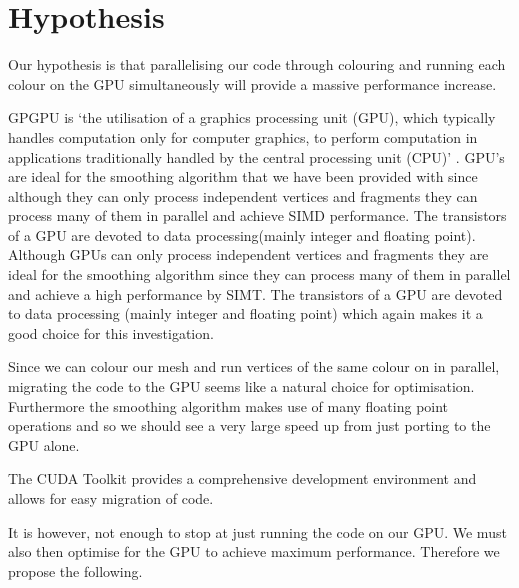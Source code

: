 \section{Hypothesis}
Our hypothesis is that parallelising our code through colouring and running each colour on the GPU simultaneously will provide a massive performance increase.


GPGPU is `the utilisation of a graphics processing unit (GPU), which typically handles computation only for computer graphics, to perform computation in applications traditionally handled by the central processing unit (CPU)' \cite{gpgpu}.
GPU's are ideal for the smoothing algorithm that we have been provided with since although they can only process independent vertices and fragments they can process many of them in parallel and achieve SIMD performance. The transistors of a GPU are devoted to data processing(mainly integer and floating point)\cite{lec7}.
Although GPUs can only process independent vertices and fragments they are ideal for the smoothing algorithm since they can process many of them in parallel and achieve a high performance by SIMT. The transistors of a GPU are devoted to data processing (mainly integer and floating point) which again makes it a good choice for this investigation\cite{lec7}.


Since we can colour our mesh and run vertices of the same colour on in parallel, migrating the code to the GPU seems like a natural choice for optimisation. Furthermore the smoothing algorithm makes use of many floating point operations and so we should see a very large speed up from just porting to the GPU alone.

The CUDA Toolkit provides a comprehensive development environment and allows for easy migration of code.




It is however, not enough to stop at just running the code on our GPU. We must also then optimise for the GPU to achieve maximum performance. Therefore we propose the following.




